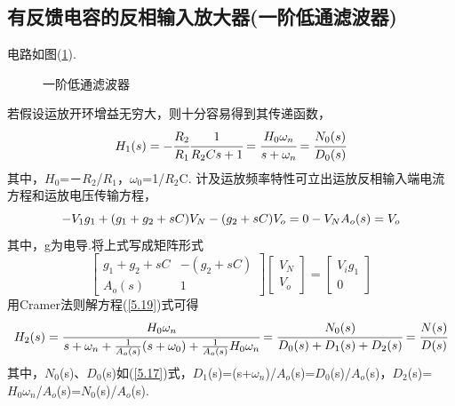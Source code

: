 \documentclass[a4paper]{article}
\begin{document}
\subsection{有反馈电容的反相输入放大器(一阶低通滤波器)}
电路如图(\ref{1orderfilter}).
\begin{figure}[!h]
\centering
{}
\caption{一阶低通滤波器}\label{1orderfilter}
\end{figure}
若假设运放开环增益无穷大，则十分容易得到其传递函数，
\begin{equation}
H_1(s) = -\cfrac{R_2}{R_1}\cfrac{1}{R_2Cs+1} = \cfrac{H_0\omega_n}{s+\omega_n} = \cfrac{N_0(s)}{D_0(s)}\label{5.17}
\end{equation}
其中，$H_0$=－$R_2$/$R_1$，$\omega_0$=1/$R_2$C.
计及运放频率特性可立出运放反相输入端电流方程和运放电压传输方程，
\begin{equation}
-V_1g_1+(g_1+g_2+sC)V_N-(g_2+sC)V_o = 0\\
-V_NA_o(s) = V_o\label{5.18}
\end{equation}
其中，g为电导.将上式写成矩阵形式
\begin{equation}
\begin{bmatrix}
g_1+g_2+sC & -(g_2+sC)\\
A_o(s) & 1
\end{bmatrix}
\begin{bmatrix}
V_N\\
V_o
\end{bmatrix}
=
\begin{bmatrix}
V_ig_1 \\
0
\end{bmatrix}
\label{5.19}
\end{equation}
用Cramer法则解方程(\ref{5.19})式可得
\begin{equation}
H_2(s) = \cfrac{H_0\omega_n}{s+\omega_n+\frac{1}{A_o(s)}(s+\omega_0)+\frac{1}{A_o(s)}H_0\omega_n}\\
= \cfrac{N_0(s)}{D_0(s)+D_1(s)+D_2(s)} = \cfrac{N(s)}{D(s)}\label{5.20}
\end{equation}
其中，$N_0$(s)、$D_0$(s)如(\ref{5.17})式，$D_1$(s)=(s+$\omega_n$)/$A_o$(s)=$D_0$(s)/$A_o$(s)，$D_2$(s)=$H_0\omega_n$/$A_o$(s)=$N_0$(s)/$A_o$(s).
\end{document}
